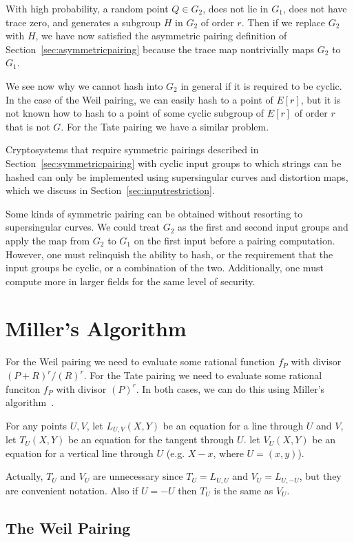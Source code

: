 With high probability, a random point $Q \in G_2$, does not
lie in $G_1$, does not have trace zero,
and generates a subgroup $H$ in $G_2$ of order $r$. Then
if we replace $G_2$ with $H$, we have now satisfied the asymmetric pairing
definition of Section~\ref{sec:asymmetricpairing} because the
trace map nontrivially maps $G_2$ to $G_1$.

We see now why we cannot hash into $G_2$ in general if it is required
to be cyclic.
In the case of the Weil pairing, we can easily hash to a point of $E[r]$,
but it is not known how to hash to a point of
some cyclic subgroup of $E[r]$ of order $r$ that is not $G$. 
For the Tate pairing we have a similar problem.

Cryptosystems that require
symmetric pairings described in Section~\ref{sec:symmetricpairing} with
cyclic input groups to which strings can be hashed can only be implemented
using supersingular curves and distortion maps, which
we discuss in Section~\ref{sec:inputrestriction}.

Some kinds of symmetric pairing can be obtained without resorting to
supersingular curves. We could treat $G_2$ as the first and second input
groups and apply the map from $G_2$ to $G_1$ on the first
input before a pairing computation. However, one must relinquish the
ability to hash, or the requirement that the input groups be cyclic, or
a combination of the two. Additionally, one must compute more
in larger fields for the same level of security.

\section {Miller's Algorithm}

For the Weil pairing we need to evaluate some rational function
$f_P$ with divisor $(P+R)^r /(R)^r$.
For the Tate pairing we need to evaluate some rational funciton
$f_P$ with divisor $(P)^r$.
In both cases, we can do this using Miller's algorithm~\cite{miller}.

For any points $U, V$,
let $L_{U,V}(X,Y)$ be an equation for a line through $U$ and $V$,
let $T_{U}(X,Y)$ be an equation for the tangent through $U$.
let
$V_{U}(X,Y)$ be an equation for a vertical line through $U$ (e.g.
$X - x$, where $U = (x, y)$).

Actually, $T_U$ and $V_U$ are unnecessary since
$T_U = L_{U,U}$ and $V_U = L_{U,-U}$, but they are convenient notation.
Also if $U = -U$ then $T_U$ is the same as $V_U$.

\subsection {The Weil Pairing}


